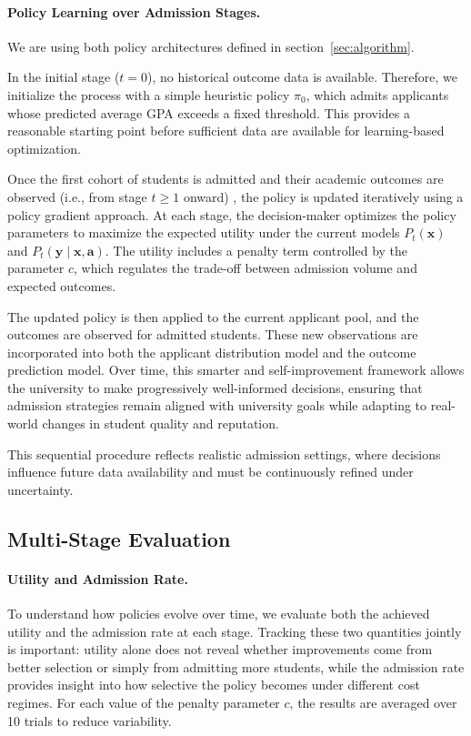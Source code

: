 \documentclass[acmlarge]{acmart-ecaf}
\newcommand {\Pfeat} {\mathbf{x}}
\newcommand {\Pact} {\mathbf{a}}
\newcommand {\Pout} {\mathbf{y}}
\begin{document}
\paragraph{Policy Learning over Admission Stages.} We are using both policy architectures defined in section~\ref{sec:algorithm}.

In the initial stage ($t = 0$), no historical outcome data is available. Therefore, we initialize the process with a simple heuristic policy $\pi_0$, which admits applicants whose predicted average GPA exceeds a fixed threshold. This provides a reasonable starting point before sufficient data are available for learning-based optimization. 

Once the first cohort of students is admitted and their academic outcomes are observed (i.e., from stage $t \geq 1$ onward) , the policy is updated iteratively using a policy gradient approach. At each stage, the decision-maker optimizes the policy parameters to maximize the expected utility under the current models $P_t(\Pfeat)$ and $P_t(\Pout \mid \Pfeat, \Pact)$. The utility includes a penalty term controlled by the parameter $c$, which regulates the trade-off between admission volume and expected outcomes.

The updated policy is then applied to the current applicant pool, and the outcomes are observed for admitted students. These new observations are incorporated into both the applicant distribution model and the outcome prediction model. Over time, this smarter and self-improvement framework allows the university to make progressively well-informed decisions, ensuring that admission strategies remain aligned with university goals while adapting to real-world changes in student quality and reputation.


This sequential procedure reflects realistic admission settings, where decisions influence future data availability and must be continuously refined under uncertainty.


  \subsection {Multi-Stage  Evaluation}

\paragraph{Utility and Admission Rate.}   To understand how policies evolve over time, we evaluate both the achieved utility and the admission rate at each stage. Tracking these two quantities jointly is important: utility alone does not reveal whether improvements come from better selection or simply from admitting more students, while the admission rate provides insight into how selective the policy becomes under different cost regimes. For each value of the penalty parameter $c$, the results are averaged over 10 trials to reduce variability.
\end{document}
